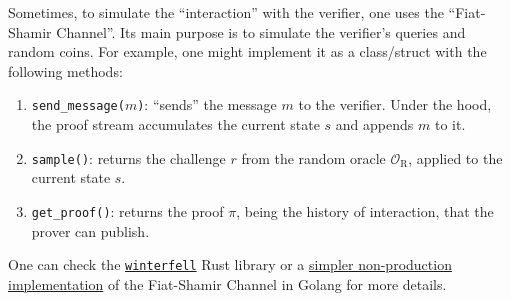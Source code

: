 \documentclass[../../book.tex]{subfiles}
\begin{document}
\begin{remark}
    Sometimes, to simulate the ``interaction'' with the verifier, one uses the
    ``Fiat-Shamir Channel''. Its main purpose is to simulate the verifier's
    queries and random coins. For example, one might implement it as a
    class/struct with the following methods:
    \begin{enumerate}
        \item \texttt{send\_message($m$)}: ``sends'' the message $m$ to the verifier. Under the hood, the proof stream accumulates the current state $s$ and appends $m$ to it.
        \item \texttt{sample()}: returns the challenge $r$ from the random oracle $\mathcal{O}_{\text{R}}$, applied to the current state $s$.
        \item \texttt{get\_proof()}: returns the proof $\pi$, being the history of interaction, that the prover can publish.
    \end{enumerate}

    One can check the \href{https://github.com/facebook/winterfell/blob/main/prover/src/channel.rs}{\texttt{winterfell}} Rust library or a \href{https://github.com/actuallyachraf/zkstarks/blob/master/fs.go}{simpler non-production implementation} of the Fiat-Shamir Channel in Golang for more details.
\end{remark}
\end{document}
